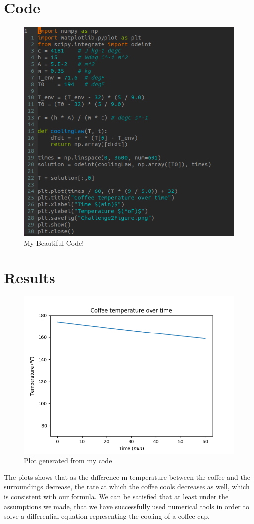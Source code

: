 \documentclass[12pt]{article}
\begin{document}
\section{Code}
\begin{figure}[H]
  \includegraphics[width=\linewidth]{CodeSnippetCC2.png}
  \caption{My Beautiful Code!}
  \label{fig:mBC}
\end{figure}
\section{Results}
\begin{figure}[H]
  \includegraphics[width=\linewidth]{Challenge2Figure.png}
  \caption{Plot generated from my code}
  \label{fig:plt1}
\end{figure}
The plots shows that as the difference in temperature between the coffee and the surroundings decrease, the rate at which the coffee cools decreases as well, which is consistent with our formula. We can be satisfied that at least under the assumptions we made, that we have successfully used numerical tools in order to solve a differential equation representing the cooling of a coffee cup.
\end{document}
